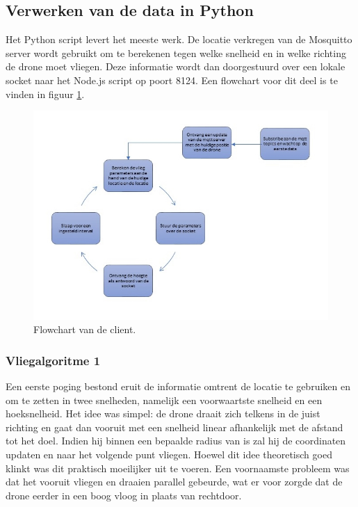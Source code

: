 \subsection{Verwerken van de data in Python}
Het Python script levert het meeste werk. De locatie verkregen van de Mosquitto server wordt gebruikt om te berekenen tegen welke snelheid en in welke richting de drone moet vliegen.
Deze informatie wordt dan doorgestuurd over een lokale socket naar het Node.js script op poort 8124.
Een flowchart voor dit deel is te vinden in figuur \ref{fig:flowchart_client}.
\begin{figure}[p]
	\centering
	\includegraphics[width=\textwidth]{images/python_client_flowchart}
	\caption[Flowchart van de client]{Flowchart van de client.}
	\label{fig:flowchart_client}
\end{figure}

\subsubsection{Vliegalgoritme 1}
Een eerste poging bestond eruit de informatie omtrent de locatie te gebruiken en om te zetten in twee snelheden, namelijk een voorwaartste snelheid en een hoeksnelheid.
Het idee was simpel: de drone draait zich telkens in de juist richting en gaat dan vooruit met een snelheid linear afhankelijk met de afstand tot het doel. Indien hij binnen een bepaalde radius van is zal hij de coordinaten updaten en naar het volgende punt vliegen.
Hoewel dit idee theoretisch goed klinkt was dit praktisch moeilijker uit te voeren.
Een voornaamste probleem was dat het vooruit vliegen en draaien parallel gebeurde, wat er voor zorgde dat de drone eerder in een boog vloog in plaats van rechtdoor.

